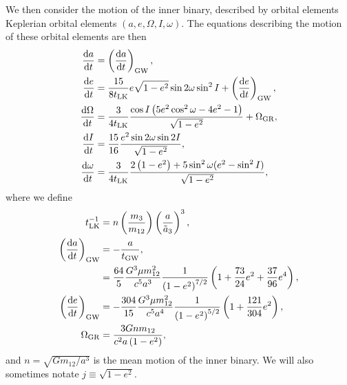 \documentclass[
        fleqn,
        usenatbib,
    ]{mnras}
\newcommand*{\rd}[2]{\frac{\mathrm{d}#1}{\mathrm{d}#2}}
\newcommand*{\p}[1]{\left(#1\right)}
\begin{document}
We then consider the motion of the inner binary, described by orbital elements
Keplerian orbital elements $(a, e, \Omega, I, \omega)$. The equations describing
the motion of these orbital elements are then \citep{peters1964,storch,bin2}
\begin{align}
    \rd{a}{t} &= \p{\rd{a}{t}}_{\rm GW},\\
    \rd{e}{t} &= \frac{15}{8t_{\rm LK}} e\sqrt{1 - e^2}\sin 2\omega
        \sin^2 I + \p{\rd{e}{t}}_{\rm GW},\\
    \rd{\Omega}{t} &= \frac{3}{4t_{\rm LK}}
        \frac{\cos I\p{5e^2 \cos^2\omega - 4e^2 - 1}}{\sqrt{1 - e^2}}
        + \Omega_{\rm GR},\\
    \rd{I}{t} &= \frac{15}{16}\frac{e^2\sin 2\omega \sin 2I}{
        \sqrt{1 - e^2}},\\
    \rd{\omega}{t} &= \frac{3}{4t_{\rm LK}}
        \frac{2\p{1 - e^2} + 5\sin^2\omega
            (e^2 - \sin^2 I)}{\sqrt{1 - e^2}},
\end{align}
where we define
\begin{align}
    t_{\rm LK}^{-1} &= n\p{\frac{m_3}{m_{12}}}\p{\frac{a}{\tilde{a}_3}}^3,\\
    \p{\rd{a}{t}}_{\rm GW} &= -\frac{a}{t_{\rm GW}},\\
         &= \frac{64}{5}\frac{G^3 \mu m_{12}^2}{c^5a^3}
            \frac{1}{\p{1 - e^2}^{7/2}}\p{1 + \frac{73}{24}e^2
                + \frac{37}{96}e^4},\label{eq:dadt_gw}\\
    \p{\rd{e}{t}}_{\rm GW} &= -\frac{304}{15}\frac{G^3 \mu m_{12}^2}{c^5a^4}
        \frac{1}{\p{1 - e^2}^{5/2}}\p{1 + \frac{121}{304}e^2}\label{eq:dedt_gw}
            ,\\
    \Omega_{\rm GR} &= \frac{3Gnm_{12}}{c^2a\p{1 - e^2}},
\end{align}
and $n = \sqrt{Gm_{12}/a^3}$ is the mean motion of the inner binary. We will
also sometimes notate $j \equiv \sqrt{1 - e^2}$.
\end{document}
